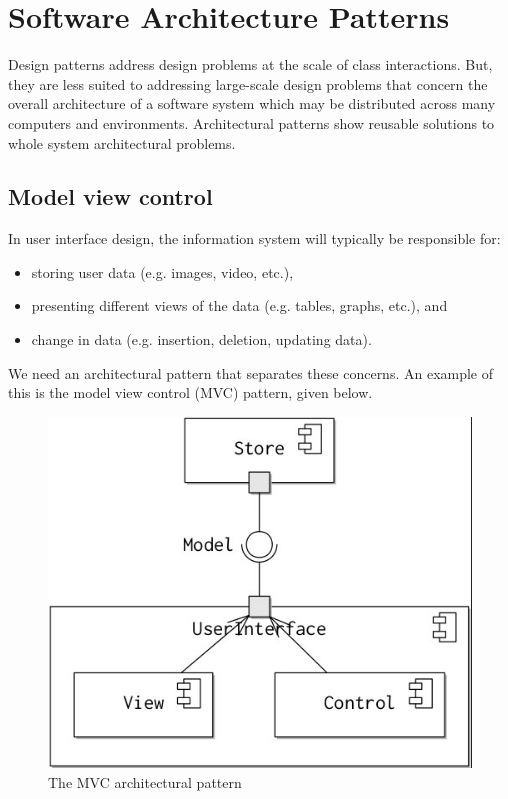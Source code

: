 \documentclass[a4paper, openany]{memoir}
\begin{document}
\chapter{Software Architecture Patterns}
Design patterns address design problems at the scale of class interactions. But, they are less suited to addressing large-scale design problems that concern the overall architecture of a software system which may be distributed across many computers and environments. Architectural patterns show reusable solutions to whole system architectural problems.

\section{Model view control}
In user interface design, the information system will typically be responsible for:
\begin{itemize}
    \item storing user data (e.g. images, video, etc.),
    \item presenting different views of the data (e.g. tables, graphs, etc.), and
    \item change in data (e.g. insertion, deletion, updating data).
\end{itemize}
We need an architectural pattern that separates these concerns. An example of this is the model view control (MVC) pattern, given below.
\begin{figure}[H]
    \centering
    \includegraphics[scale=0.6]{src/14.3 MVC.png}
    \caption{The MVC architectural pattern}
\end{figure}
\end{document}
